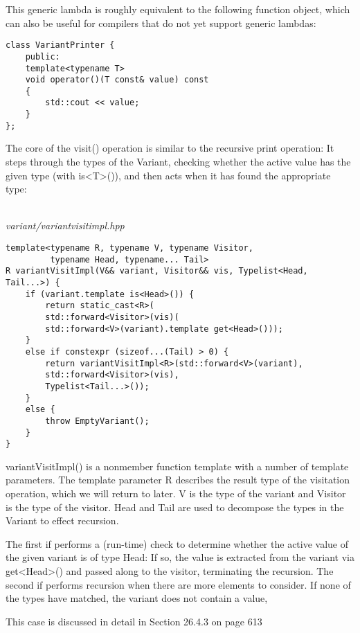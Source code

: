 This generic lambda is roughly equivalent to the following function object, which can also be useful for compilers that do not yet support generic lambdas:

\begin{lstlisting}[style=styleCXX]
class VariantPrinter {
	public:
	template<typename T>
	void operator()(T const& value) const
	{
		std::cout << value;
	}
};
\end{lstlisting}

The core of the visit() operation is similar to the recursive print operation: It steps through the types of the Variant, checking whether the active value has the given type (with is<T>()), and then acts when it has found the appropriate type:

\hspace*{\fill} \\ %
\noindent
\textit{variant/variantvisitimpl.hpp}
\begin{lstlisting}[style=styleCXX]
template<typename R, typename V, typename Visitor,
		 typename Head, typename... Tail>
R variantVisitImpl(V&& variant, Visitor&& vis, Typelist<Head, Tail...>) {
	if (variant.template is<Head>()) {
		return static_cast<R>(
		std::forward<Visitor>(vis)(
		std::forward<V>(variant).template get<Head>()));
	}
	else if constexpr (sizeof...(Tail) > 0) {
		return variantVisitImpl<R>(std::forward<V>(variant),
		std::forward<Visitor>(vis),
		Typelist<Tail...>());
	}
	else {
		throw EmptyVariant();
	}
}
\end{lstlisting}

variantVisitImpl() is a nonmember function template with a number of template parameters. The template parameter R describes the result type of the visitation operation, which we will return to later. V is the type of the variant and Visitor is the type of the visitor. Head and Tail are used to decompose the types in the Variant to effect recursion.

The first if performs a (run-time) check to determine whether the active value of the given variant is of type Head: If so, the value is extracted from the variant via get<Head>() and passed along to the visitor, terminating the recursion. The second if performs recursion when there are more elements to consider. If none of the types have matched, the variant does not contain a value,

\begin{tcolorbox}[colback=webgreen!5!white,colframe=webgreen!75!black]
\hspace*{0.75cm}This case is discussed in detail in Section 26.4.3 on page 613
\end{tcolorbox}


